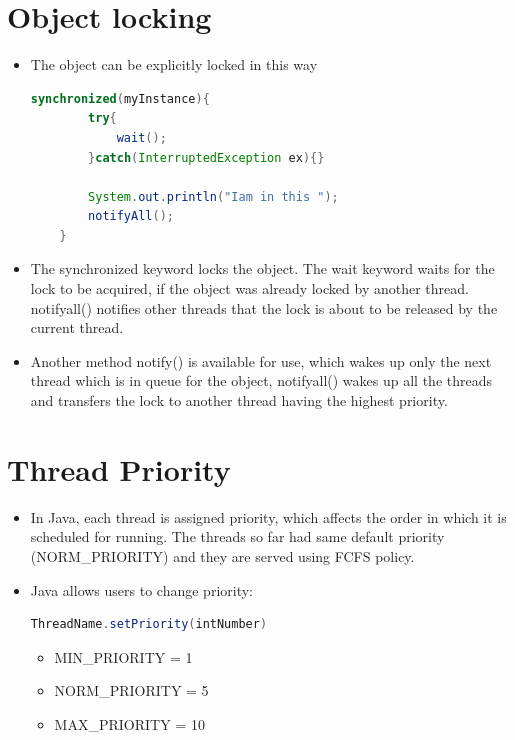 \documentclass[12pt, a4paper]{book}
\begin{document}
\section{Object locking}
\begin{itemize}
    \item The object can be explicitly locked in this way
          \begin{lstlisting}[language=java]
    synchronized(myInstance){
        try{
            wait();
        }catch(InterruptedException ex){}

        System.out.println("Iam in this ");
        notifyAll();
    }
            \end{lstlisting}
    \item The synchronized keyword locks the object. The wait keyword waits for the lock to be acquired, if the object was already locked by another thread. notifyall() notifies other threads that the lock is about to be released by the current thread.
    \item Another method notify() is available for use, which wakes up only the next thread which is in queue for the object, notifyall() wakes up all the threads and transfers the lock to another thread having the highest priority.
\end{itemize}

\section{Thread Priority}
\begin{itemize}
    \item In Java, each thread is assigned priority, which affects the order in which it is scheduled for running. The threads so far had same default priority (NORM\_PRIORITY) and they are served using FCFS policy.

    \item Java allows users to change priority:
          \begin{lstlisting}[language=java]
            ThreadName.setPriority(intNumber)
                \end{lstlisting}
          \begin{itemize}
              \item MIN\_PRIORITY = 1
              \item NORM\_PRIORITY = 5
              \item MAX\_PRIORITY = 10
          \end{itemize}
\end{itemize}
\end{document}
